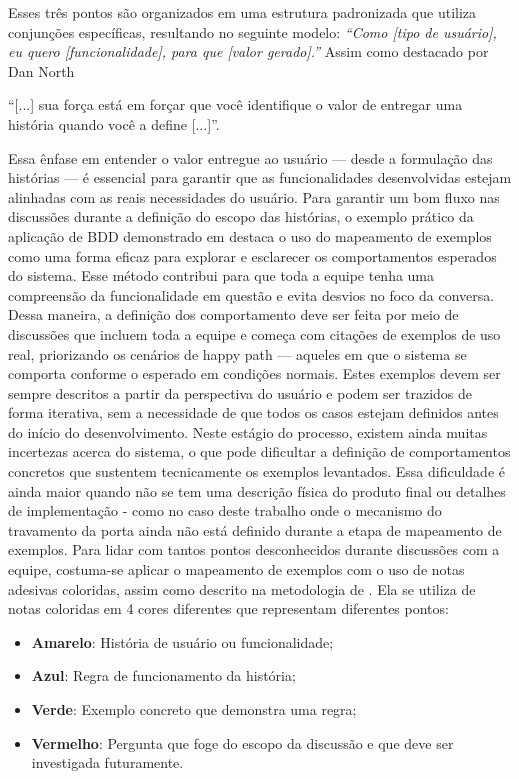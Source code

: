 Esses três pontos são organizados em uma estrutura padronizada que utiliza conjunções específicas, resultando no seguinte modelo:
\textit{“Como [tipo de usuário], eu quero [funcionalidade], para que [valor gerado].”}
Assim como destacado por Dan North 
\begin{citacao}
“[...] sua força está em forçar que você identifique o valor de entregar uma história quando você a define [...]”. \cite{north2006bdd}
\end{citacao}
Essa ênfase em entender o valor entregue ao usuário — desde a formulação das histórias — é essencial para garantir que as funcionalidades desenvolvidas estejam 
alinhadas com as reais necessidades do usuário.
Para garantir um bom fluxo nas discussões durante a definição do escopo das histórias, o exemplo prático da aplicação de BDD demonstrado em \cite{gosling2014cucumber} 
destaca o uso do mapeamento de exemplos como uma forma eficaz para explorar e esclarecer os comportamentos esperados do sistema. Esse método contribui para que 
toda a equipe tenha uma compreensão da funcionalidade em questão e evita desvios no foco da conversa.
Dessa maneira, a definição dos comportamento deve ser feita por meio de discussões que incluem toda a equipe e começa com citações de exemplos de uso real, priorizando 
os cenários de happy path — aqueles em que o sistema se comporta conforme o esperado em condições normais. Estes exemplos devem ser sempre descritos a partir da 
perspectiva do usuário e podem ser trazidos de forma iterativa, sem a necessidade de que todos os casos estejam definidos antes do início do desenvolvimento. 
Neste estágio do processo, existem ainda muitas incertezas acerca do sistema, o que pode dificultar a definição de comportamentos concretos que sustentem 
tecnicamente os exemplos levantados. Essa dificuldade é ainda maior quando não se tem uma descrição física do produto final ou detalhes de implementação - como no 
caso deste trabalho onde o mecanismo do travamento da porta ainda não está definido durante a etapa de mapeamento de exemplos.
Para lidar com tantos pontos desconhecidos durante discussões com a equipe, costuma-se aplicar o mapeamento de exemplos com o uso de notas adesivas coloridas, 
assim como descrito na metodologia de \cite{cucumberExampleMapping}. Ela se utiliza de notas coloridas em 4 cores diferentes que representam diferentes pontos:

\begin{itemize}
	\item \textbf{Amarelo}: História de usuário ou funcionalidade;
	\item \textbf{Azul}: Regra de funcionamento da história;
	\item \textbf{Verde}: Exemplo concreto que demonstra uma regra;
	\item \textbf{Vermelho}: Pergunta que foge do escopo da discussão e que deve ser investigada futuramente.
\end{itemize}


